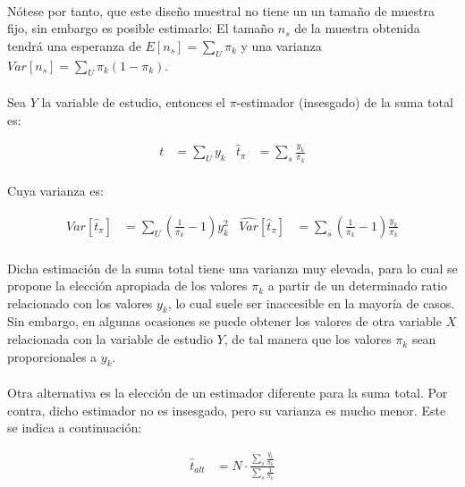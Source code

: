 \documentclass{article}
\begin{document}
    \paragraph{}
    Nótese por tanto, que este diseño muestral no tiene un un tamaño de muestra fijo, sin embargo es posible estimarlo: El tamaño $n_s$ de la muestra obtenida tendrá una esperanza de $E[n_s] = \sum_U\pi_k$ y una varianza $Var[n_s] = \sum_U \pi_k(1-\pi_k)$.

    \paragraph{}
    Sea $Y$ la variable de estudio, entonces el $\pi$-estimador (insesgado) de la suma total es:

    \begin{align}
      t &= \sum_Uy_k & \widehat{t}_\pi &= \sum_s\frac{y_k}{\pi_k}
    \end{align}

    \paragraph{}
    Cuya varianza es:

    \begin{align}
    Var[\widehat{t}_\pi] &= \sum_U(\frac{1}{\pi_k} - 1)y_k^2 &     \widehat{Var}[\widehat{t}_\pi] &= \sum_s(\frac{1}{\pi_k} - 1)\frac{y_k}{\pi_k}
    \end{align}

    \paragraph{}
    Dicha estimación de la suma total tiene una varianza muy elevada, para lo cual se propone la elección apropiada de los valores $\pi_k$ a partir de un determinado ratio relacionado con los valores $y_k$, lo cual suele ser inaccesible en la mayoría de casos. Sin embargo, en algunas ocasiones se puede obtener los valores de otra variable $X$ relacionada con la variable de estudio $Y$, de tal manera que los valores $\pi_k$ sean proporcionales a $y_k$.

    \paragraph{}
    Otra alternativa es la elección de un estimador diferente para la suma total. Por contra, dicho estimador no es insesgado, pero su varianza es mucho menor. Este se indica a continuación:

    \begin{align}
      \widehat{t}_{alt} &= N \cdot \frac{\sum_s\frac{y_k}{\pi_k}}{\sum_s\frac{1}{\pi_k}}
    \end{align}



	\nocite{muest2017}
  \nocite{sarndal2003model}

  
  
\end{document}
